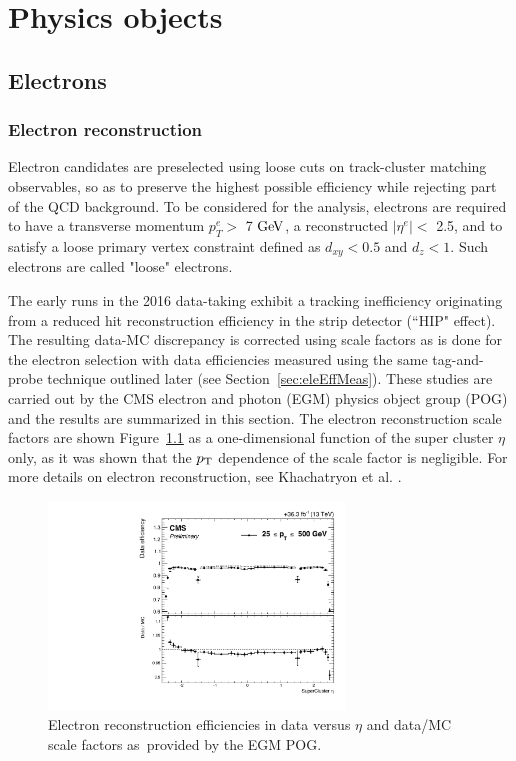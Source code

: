 \chapter{Physics objects}\label{sec:objects}

\section{Electrons}

\subsection{Electron reconstruction}
\label{sec:eleReco}


Electron candidates are preselected using loose cuts on track-cluster matching observables, so as to preserve the highest possible efficiency while rejecting part of the QCD background. To be considered for the analysis, electrons are required to have a
transverse momentum $p^e_T >$ 7 $\mathrm{Ge\kern -0.1em V}$, a reconstructed $|\eta^e| <$ 2.5, and to satisfy a loose primary vertex 
constraint defined as $d_{xy} < 0.5$ and $d_z < 1$. 
Such electrons are called "loose" electrons.

The early runs in the 2016 data-taking exhibit a tracking inefficiency originating from a reduced hit reconstruction efficiency in the strip detector (``HIP" effect). 
The resulting data-MC discrepancy is corrected using scale factors as is done for the electron selection with data efficiencies measured using the same tag-and-probe technique outlined later (see Section~\ref{sec:eleEffMeas}). 
These studies are carried out by the CMS electron and photon (EGM) physics object group (POG) and the results are summarized in this section.
The electron reconstruction scale factors are shown Figure~\ref{fig:ele_rec_scale_factors} as a one-dimensional function of the super cluster $\eta$ only, as it was shown that the $p_{\rm{T}}$ dependence of the scale factor is negligible. For more details on electron reconstruction, see Khachatryon et al. \cite{ElectronLegacy}. 

\begin{figure}[!htb]
\vspace*{0.3cm}
\begin{center}
\includegraphics[width=0.7\textwidth]{Figures/Electrons/ele_rec_scale_factors.pdf}
\end{center}
\caption{Electron reconstruction efficiencies in data versus $\eta$ and data/MC scale factors as provided by the EGM POG.}
\label{fig:ele_rec_scale_factors}
\end{figure}

